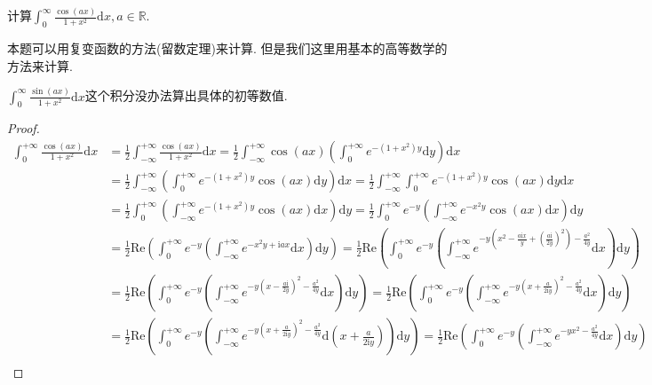 \documentclass[../../main.tex]{subfiles}
\begin{document}
\begin{example}
计算$\int_{0}^{\infty}\frac{\cos(ax)}{1 + x^{2}}\mathrm{d}x, a\in\mathbb{R}$. 
\end{example}
\begin{remark}
本题可以用复变函数的方法(留数定理)来计算. 但是我们这里用基本的高等数学的方法来计算.

$\int_0^{\infty}{\frac{\sin \left( ax \right)}{1+x^2}\mathrm{d}x}$这个积分没办法算出具体的初等数值.
\end{remark}
\begin{proof}
\begin{align*}
\int_0^{+\infty}{\frac{\cos \left( ax \right)}{1+x^2}\mathrm{d}x}&=\frac{1}{2}\int_{-\infty}^{+\infty}{\frac{\cos \left( ax \right)}{1+x^2}\mathrm{d}x}=\frac{1}{2}\int_{-\infty}^{+\infty}{\cos \left( ax \right) \left( \int_0^{+\infty}{e^{-\left( 1+x^2 \right) y}\mathrm{d}y} \right) \mathrm{d}x}\\
&=\frac{1}{2}\int_{-\infty}^{+\infty}{\left( \int_0^{+\infty}{e^{-\left( 1+x^2 \right) y}\cos \left( ax \right) \mathrm{d}y} \right) \mathrm{d}x}=\frac{1}{2}\int_{-\infty}^{+\infty}{\int_0^{+\infty}{e^{-\left( 1+x^2 \right) y}\cos \left( ax \right) \mathrm{d}y}}\mathrm{d}x\\
&=\frac{1}{2}\int_0^{+\infty}{\left( \int_{-\infty}^{+\infty}{e^{-\left( 1+x^2 \right) y}\cos \left( ax \right) \mathrm{d}x} \right) \mathrm{d}y}=\frac{1}{2}\int_0^{+\infty}{e^{-y}\left( \int_{-\infty}^{+\infty}{e^{-x^2y}\cos \left( ax \right) \mathrm{d}x} \right)}\mathrm{d}y\\
&=\frac{1}{2}\mathrm{Re}\left( \int_0^{+\infty}{e^{-y}\left( \int_{-\infty}^{+\infty}{e^{-x^2y+\mathrm{i}ax}\mathrm{d}x} \right) \mathrm{d}y} \right) =\frac{1}{2}\mathrm{Re}\left( \int_0^{+\infty}{e^{-y}\left( \int_{-\infty}^{+\infty}{e^{-y\left( x^2-\frac{a\mathrm{i}x}{y}+\left( \frac{a\mathrm{i}}{2y} \right) ^2 \right) -\frac{a^2}{4y}}\mathrm{d}x} \right) \mathrm{d}y} \right) \\
&=\frac{1}{2}\mathrm{Re}\left( \int_0^{+\infty}{e^{-y}\left( \int_{-\infty}^{+\infty}{e^{-y\left( x-\frac{a\mathrm{i}}{2y} \right) ^2-\frac{a^2}{4y}}\mathrm{d}x} \right) \mathrm{d}y} \right) =\frac{1}{2}\mathrm{Re}\left( \int_0^{+\infty}{e^{-y}\left( \int_{-\infty}^{+\infty}{e^{-y\left( x+\frac{a}{2\mathrm{i}y} \right) ^2-\frac{a^2}{4y}}\mathrm{d}x} \right) \mathrm{d}y} \right) \\
&=\frac{1}{2}\mathrm{Re}\left( \int_0^{+\infty}{e^{-y}\left( \int_{-\infty}^{+\infty}{e^{-y\left( x+\frac{a}{2\mathrm{i}y} \right) ^2-\frac{a^2}{4y}}\mathrm{d}\left( x+\frac{a}{2\mathrm{i}y} \right)} \right) \mathrm{d}y} \right) =\frac{1}{2}\mathrm{Re}\left( \int_0^{+\infty}{e^{-y}\left( \int_{-\infty}^{+\infty}{e^{-yx^2-\frac{a^2}{4y}}\mathrm{d}x} \right) \mathrm{d}y} \right) \\

\end{align*}
\end{proof}
\end{document}
